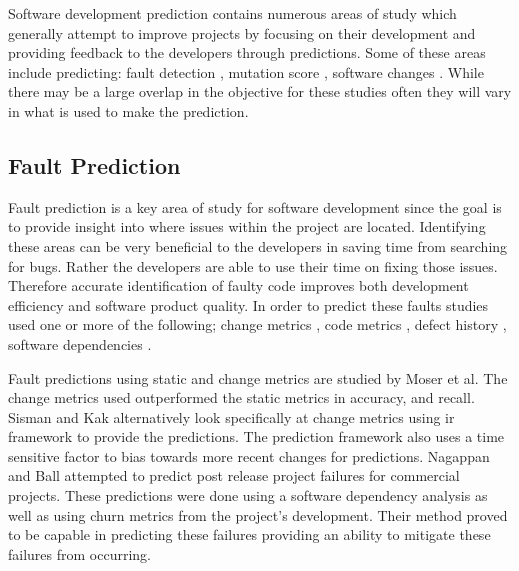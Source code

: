 Software development prediction contains numerous areas of study which generally attempt to improve projects by focusing on their development and providing feedback to the developers through predictions. Some of these areas include predicting: fault detection \cite{Nagappan2007, Moser2008, Thwin2005, Sisman2012}, mutation score \cite{Jalbert2012}, software changes \cite{Bantelay2013, Chaturvedi2014, Giger2012, Hassan2004, Kagdi2007, Ying2004}. While there may be a large overlap in the objective for these studies often they will vary in what is used to make the prediction.

\subsection{Fault Prediction}

Fault prediction is a key area of study for software development since the goal is to provide insight into where issues within the project are located. Identifying these areas can be very beneficial to the developers in saving time from searching for bugs. Rather the developers are able to use their time on fixing those issues. Therefore accurate identification of faulty code improves both development efficiency and software product quality. In order to predict these faults studies used one or more of the following; change metrics \cite{Moser2008, Sisman2012, Nagappan2007}, code metrics \cite{Moser2008, Thwin2005}, defect history \cite{Sisman2012}, software dependencies \cite{Nagappan2007}.

Fault predictions using static and change metrics are studied by Moser et al. The change metrics used outperformed the static metrics in accuracy, and recall. Sisman and Kak alternatively look specifically at change metrics using \gls{ir} framework to provide the predictions. The prediction framework also uses a time sensitive factor to bias towards more recent changes for predictions. Nagappan and Ball attempted to predict post release project failures for commercial projects. These predictions were done using a software dependency analysis as well as using churn metrics from the project's development. Their method proved to be capable in predicting these failures providing an ability to mitigate these failures from occurring.



